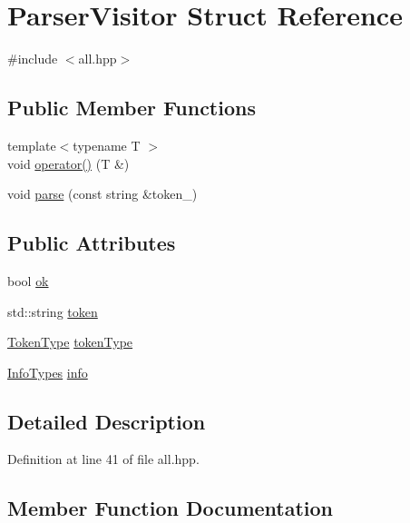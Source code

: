 \hypertarget{struct_parser_visitor}{}\section{Parser\+Visitor Struct Reference}
\label{struct_parser_visitor}


{\ttfamily \#include $<$all.\+hpp$>$}

\subsection*{Public Member Functions}
\begin{DoxyCompactItemize}
\item 
{\footnotesize template$<$typename T $>$ }\\void \hyperlink{struct_parser_visitor_aa5a5df33bf6193a75c72eb2eeb492429}{operator()} (T \&)
\item 
void \hyperlink{struct_parser_visitor_a241c6d04c5a0e736ee477d5d93af8ac7}{parse} (const string \&token\+\_\+)
\end{DoxyCompactItemize}
\subsection*{Public Attributes}
\begin{DoxyCompactItemize}
\item 
bool \hyperlink{struct_parser_visitor_af5c2d247a1ec646aded499e01ca71553}{ok}
\item 
std\+::string \hyperlink{struct_parser_visitor_a75c39e97645b48c171b9912440aa9ca2}{token}
\item 
\hyperlink{arch_8hpp_aa520fbf142ba1e7e659590c07da31921}{Token\+Type} \hyperlink{struct_parser_visitor_acaa4d8ca1662ec314ae2a8f048f6aca3}{token\+Type}
\item 
\hyperlink{all_8hpp_a58b4bafc5e94cba5e42b944a85b061db}{Info\+Types} \hyperlink{struct_parser_visitor_a44159efad79cb74d477675367d8dcc3f}{info}
\end{DoxyCompactItemize}


\subsection{Detailed Description}


Definition at line 41 of file all.\+hpp.



\subsection{Member Function Documentation}
\hypertarget{struct_parser_visitor_aa5a5df33bf6193a75c72eb2eeb492429}{}
